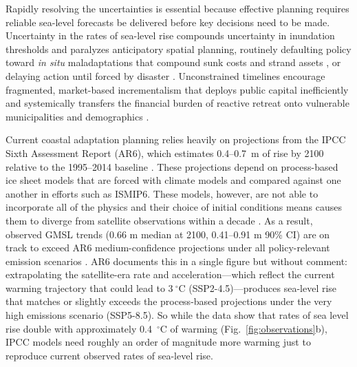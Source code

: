 \documentclass[12pt]{article}
\begin{document}
Rapidly resolving the uncertainties is essential because effective planning requires reliable sea-level forecasts be delivered before key decisions need to be made. Uncertainty in the rates of sea-level rise compounds uncertainty in inundation thresholds and paralyzes anticipatory spatial planning, routinely defaulting policy toward \emph{in situ} maladaptations that compound sunk costs and strand assets \citep{ODonnell2022}, or delaying action until forced by disaster \citep{Tubridy2021}. Unconstrained timelines encourage fragmented, market-based incrementalism that deploys public capital inefficiently \citep{SidersAjibadeCasagrande2021} and systemically transfers the financial burden of reactive retreat onto vulnerable municipalities and demographics \citep{SidersAjibade2021}. 

Current coastal adaptation planning relies heavily on projections from the IPCC Sixth Assessment Report (AR6), which estimates 0.4--0.7~m of rise by 2100 relative to the 1995--2014 baseline \citep{Fox-Kemper2021, Hirschfeld2023}. These projections depend on process-based ice sheet models that are forced with climate models and compared against one another in efforts such as ISMIP6. These models, however, are not able to incorporate all of the physics and their choice of initial conditions means causes them to diverge from satellite observations within a decade \citep{Aschwanden2021, Fricker2025}. As a result, observed GMSL trends (0.66 m median at 2100, 0.41--0.91 m 90\% CI) are on track to exceed AR6 medium-confidence projections under all policy-relevant emission scenarios \citep{Hamlington2022, Hamlington2024}. AR6 documents this in a single figure but without comment: extrapolating the satellite-era rate and acceleration---which reflect the current warming trajectory that could lead to $3\ ^\circ$C (SSP2-4.5)---produces sea-level rise that matches or slightly exceeds the process-based projections under the very high emissions scenario (SSP5-8.5). So while the data show that rates of sea level rise double with approximately 0.4~$^\circ$C of warming (Fig.~\ref{fig:observations}b), IPCC models need roughly an order of magnitude more warming just to reproduce current observed rates of sea-level rise. 
\end{document}
